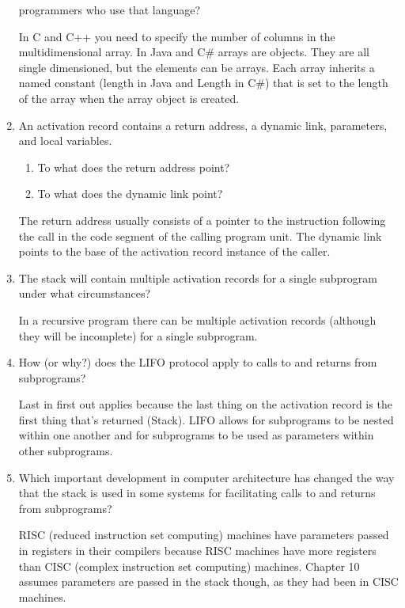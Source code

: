 \begin{enumerate}
programmers who use that language?
\begin{answer}
In C and C++ you need to specify the number of columns in the multidimensional array. In Java and C\# arrays are objects. They are all single dimensioned, but the elements can be arrays. Each array inherits a named constant (length in Java and Length in C\#) that is set to the length of
the array when the array object is created.
\end{answer}
\item An activation record contains a return
address, a dynamic link, parameters, and
local variables.
\begin{enumerate}
\item To what does the return address point?
\item To what does the dynamic link point?
\end{enumerate}
\begin{answer}
The return address usually consists of a pointer to the instruction following the call in the code segment of the calling program unit.
The dynamic link points to the base of the activation record instance of the caller.
\end{answer}
\item The stack will contain multiple activation
records for a single subprogram under what
circumstances?
\begin{answer}
In a recursive program there can be multiple activation records (although they will be incomplete) for a single subprogram.
\end{answer}
\item How (or why?) does the LIFO protocol apply to
calls to and returns from subprograms?
\begin{answer}
Last in first out applies because the last thing on the activation record is the first thing that's returned (Stack). LIFO allows for subprograms to be nested within one another and for subprograms to be used as parameters within other subprograms.
\end{answer}
\item Which important development in computer architecture
has changed the way that the stack is used in some
systems for facilitating calls to and returns from
subprograms?
\begin{answer}
RISC (reduced instruction set computing) machines have parameters passed in registers in their compilers because RISC machines have more registers than CISC (complex instruction set computing) machines. Chapter 10 assumes parameters are passed in the stack though, as they had been in CISC machines.

\end{answer}
\end{enumerate}
